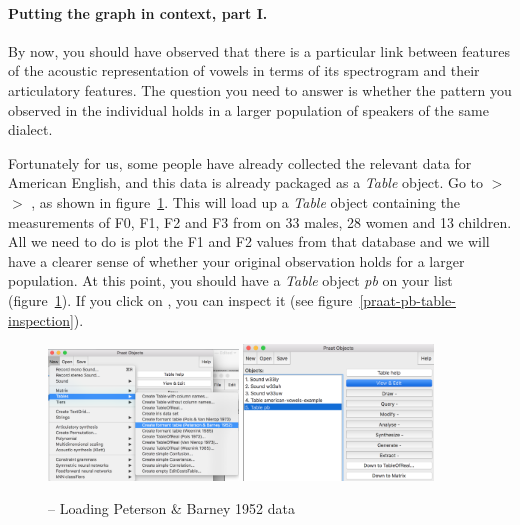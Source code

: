 \paragraph{Putting the graph in context, part I.} By now, you should have observed that there is a particular link between features of the acoustic representation of vowels in terms of its spectrogram and their articulatory features. The question you need to answer is whether the pattern you observed in the individual holds in a larger population of speakers of the same dialect.

Fortunately for us, some people have already collected the relevant data for American English, and this data is already packaged as a \Praat{} \emph{Table} object. Go to  $>$  $>$ , as shown in figure~\ref{praat-pb-table}. This will load up a \emph{Table} object containing the measurements of F0, F1, F2 and F3 from  on 33 males, 28 women and 13 children. All we need to do is plot the F1 and F2 values from that database and we will have a clearer sense of whether your original observation holds for a larger population. At this point, you should have a \emph{Table} object \emph{pb} on your  list (figure~\ref{praat-pb-table}). If you click on , you can inspect it (see figure~\ref{praat-pb-table-inspection}).

\begin{figure}[!tbp]
\caption{\Praat{} -- Loading Peterson \& Barney 1952 data}
\label{praat-pb-table}
	\begin{center}
		\includegraphics[width=0.45\textwidth]{./figures/Praat-17-PB-table}
		\includegraphics[width=0.45\textwidth]{./figures/Praat-18-PB-table-in-objects}
	\end{center}
\end{figure}


